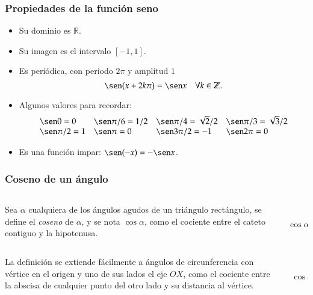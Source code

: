 \begin{frame}
\frametitle{Propiedades de la función seno}
\begin{itemize}
\item Su dominio es $\mathbb{R}$.
\item Su imagen es el intervalo $[-1,1]$.
\item Es periódica, con periodo $2\pi$ y amplitud $1$
\[\sen (x+2k\pi)= \sen x\quad \forall k\in \mathbb{Z}.\]
\item Algunos valores para recordar:
\[
\begin{array}{llll}
\sen 0=0 & \sen \pi/6= 1/2 & \sen \pi/4=\sqrt{2}/2 & \sen \pi/3= \sqrt{3}/2\\
\sen \pi/2 =1 & \sen \pi = 0 & \sen 3\pi/2=-1 & \sen 2\pi=0
\end{array}
\]
\item Es una función impar: $\sen(-x)=-\sen x$.
\end{itemize}
\end{frame} 


\begin{frame}
\frametitle{Coseno de un ángulo}
\begin{definicion}
\begin{columns}
\begin{column}{0.6\textwidth}
Sea $\alpha$ cualquiera de los ángulos agudos de un triángulo rectángulo, se define el \emph{coseno} de $\alpha$, y se
nota $\cos \alpha$, como el cociente entre el cateto contiguo y la hipotenusa.
\end{column}
\begin{column}{0.2\textwidth}
\begin{center}
\scalebox{1}{}\\
\scriptsize 
$\cos \alpha= \dfrac{AB}{AC}$
\end{center}
\end{column}
\end{columns}
\end{definicion}
\bigskip
\begin{columns}
\begin{column}{0.6\textwidth}
La definición se extiende fácilmente a ángulos de circunferencia con vértice en el origen y uno de sus lados el eje $OX$, como el cociente entre la abscisa de cualquier punto del otro lado y su distancia al vértice.
\end{column}
\begin{column}{0.2\textwidth}
\begin{center}
\scalebox{1}{}\\
\scriptsize
$\cos \alpha= \dfrac{AB}{AC}$
\end{center}
\end{column}
\end{columns}
\end{frame} 


